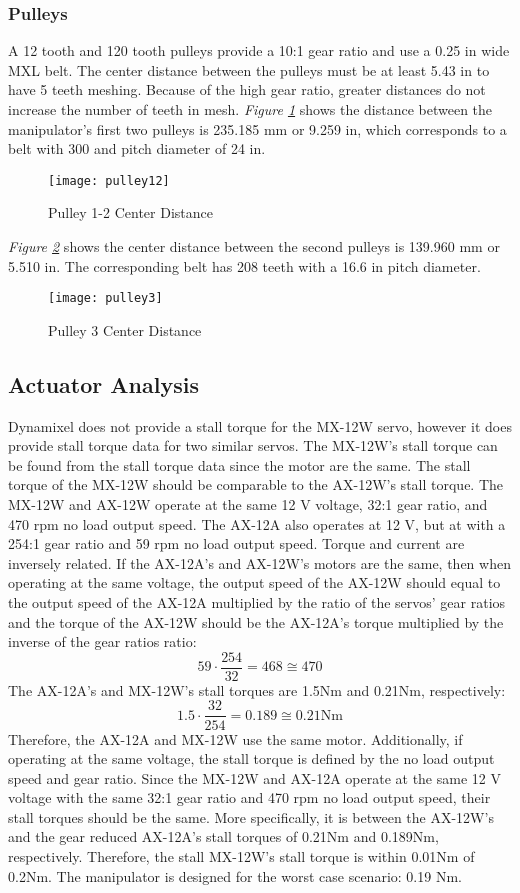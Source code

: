 \subsubsection{Pulleys}
A 12 tooth and 120 tooth pulleys provide a 10:1 gear ratio and use a 0.25 in wide MXL belt. The center distance between the pulleys must be at least 5.43 in to have 5 teeth meshing. Because of the high gear ratio, greater distances do not increase the number of teeth in mesh. \emph{Figure \ref{fig:pulley12}} shows the distance between the manipulator’s first two pulleys is 235.185 mm or 9.259 in, which corresponds to a belt with 300 and pitch diameter of 24 in.
\newpage
\begin{figure}[htp]
  \center
  \texttt{[image: pulley12]}
  \caption{Pulley 1-2 Center Distance}
  \label{fig:pulley12}
\end{figure}
\emph{Figure \ref{fig:pulley3}} shows the center distance between the second pulleys is 139.960 mm or 5.510 in. The corresponding belt has 208 teeth with a 16.6 in pitch diameter.
\begin{figure}[htp]
  \center
  \texttt{[image: pulley3]}
  \caption{Pulley 3 Center Distance}
  \label{fig:pulley3}
\end{figure}
\newpage
\subsection{Actuator Analysis}
Dynamixel does not provide a stall torque for the MX-12W servo, however it does provide stall torque data for two similar servos. The MX-12W’s stall torque can be found from the stall torque data since the motor are the same. The stall torque of the MX-12W should be comparable to the AX-12W’s stall torque. The MX-12W and AX-12W operate at the same 12 V voltage, 32:1 gear ratio, and 470 rpm no load output speed. The AX-12A also operates at 12 V, but at with a 254:1 gear ratio and 59 rpm no load output speed. Torque and current are inversely related. If the AX-12A’s and AX-12W’s motors are the same, then when operating at the same voltage, the output speed of the AX-12W should equal to the output speed of the AX-12A multiplied by the ratio of the servos’ gear ratios and the torque of the AX-12W should be the AX-12A’s torque multiplied by the inverse of the gear ratios ratio:
\[ 59\cdot\frac{254}{32}=468 \cong 470 \]
The AX-12A’s and MX-12W’s stall torques are 1.5Nm and 0.21Nm, respectively:
\[ 1.5\cdot\frac{32}{254}=0.189\cong0.21\text{Nm} \]
Therefore, the AX-12A and MX-12W use the same motor. Additionally, if operating at the same voltage, the stall torque is defined by the no load output speed and gear ratio. Since the MX-12W and AX-12A operate at the same 12 V voltage with the same 32:1 gear ratio and 470 rpm no load output speed, their stall torques should be the same. More specifically, it is between the AX-12W’s and the gear reduced AX-12A’s stall torques of 0.21Nm and 0.189Nm, respectively. Therefore, the stall MX-12W’s stall torque is within 0.01Nm of 0.2Nm. The manipulator is designed for the worst case scenario: 0.19 Nm.


